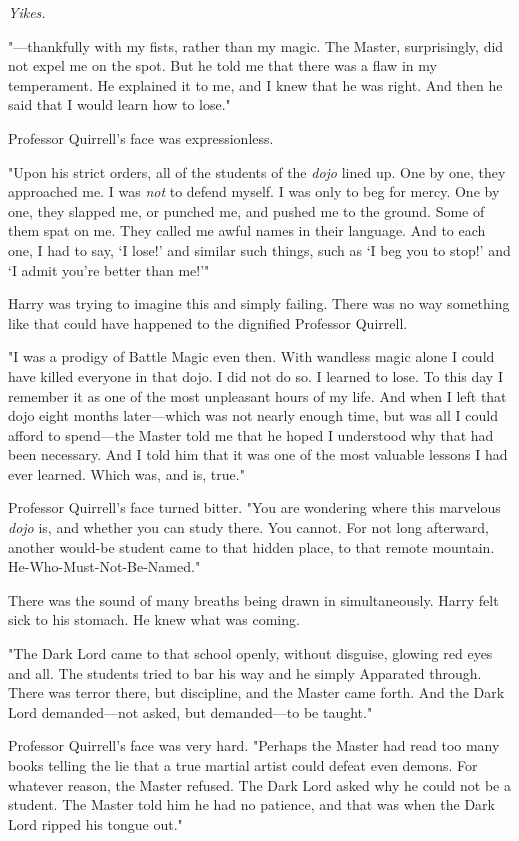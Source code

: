 \emph{Yikes.}

"---thankfully with my fists, rather than my magic. The Master, surprisingly, 
did not expel me on the spot. But he told me that there was a flaw in my 
temperament. He explained it to me, and I knew that he was right. And then he 
said that I would learn how to lose."

Professor Quirrell's face was expressionless.

"Upon his strict orders, all of the students of the \emph{dojo} lined up. One 
by one, they approached me. I was \emph{not} to defend myself. I was only to 
beg for mercy. One by one, they slapped me, or punched me, and pushed me to the 
ground. Some of them spat on me. They called me awful names in their language. 
And to each one, I had to say, `I lose!' and similar such things, such as `I 
beg you to stop!' and `I admit you're better than me!'"

Harry was trying to imagine this and simply failing. There was no way something 
like that could have happened to the dignified Professor Quirrell.

"I was a prodigy of Battle Magic even then. With wandless magic alone I could 
have killed everyone in that dojo. I did not do so. I learned to lose. To this 
day I remember it as one of the most unpleasant hours of my life. And when I 
left that dojo eight months later---which was not nearly enough time, but was 
all I could afford to spend---the Master told me that he hoped I understood why 
that had been necessary. And I told him that it was one of the most valuable 
lessons I had ever learned. Which was, and is, true."

Professor Quirrell's face turned bitter. "You are wondering where this 
marvelous \emph{dojo} is, and whether you can study there. You cannot. For not 
long afterward, another would-be student came to that hidden place, to that 
remote mountain. He-Who-Must-Not-Be-Named."

There was the sound of many breaths being drawn in simultaneously. Harry felt 
sick to his stomach. He knew what was coming.

"The Dark Lord came to that school openly, without disguise, glowing red eyes 
and all. The students tried to bar his way and he simply Apparated through. 
There was terror there, but discipline, and the Master came forth. And the Dark 
Lord demanded---not asked, but demanded---to be taught."

Professor Quirrell's face was very hard. "Perhaps the Master had read too many 
books telling the lie that a true martial artist could defeat even demons. For 
whatever reason, the Master refused. The Dark Lord asked why he could not be a 
student. The Master told him he had no patience, and that was when the Dark 
Lord ripped his tongue out."


